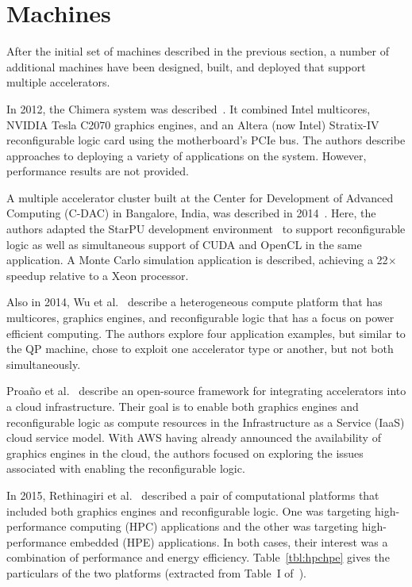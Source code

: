 \section{Machines}
\label{sec:machines}

After the initial set of machines described in the previous section,
a number of additional machines have been designed, built, and deployed
that support multiple accelerators.

In 2012, the Chimera system was described~\cite{ibs12}.
It combined Intel multicores, NVIDIA Tesla C2070 graphics engines,
and an Altera (now Intel) Stratix-IV reconfigurable logic card using
the motherboard's PCIe bus. The authors describe approaches to deploying
a variety of applications on the system. However, performance results
are not provided.

A multiple accelerator cluster built at the Center for Development of
Advanced Computing (C-DAC) in Bangalore, India, was described in
2014~\cite{admb14}. Here, the authors adapted the StarPU development
environment~\cite{starpu} to support reconfigurable logic as well as
simultaneous support of CUDA and OpenCL in the same application.
A Monte Carlo simulation application is described, achieving a 22$\times$
speedup relative to a Xeon processor.

Also in 2014, Wu et al.~\cite{whk+14} describe a heterogeneous compute
platform that has multicores, graphics engines, and reconfigurable logic
that has a focus on power efficient computing.
The authors explore four application examples, but similar to the QP
machine, chose to exploit one accelerator type or another, but not both
simultaneously.

Proa\~no et al.~\cite{pcc14} describe an open-source framework for
integrating accelerators into a cloud infrastructure.  Their goal is
to enable both graphics engines and reconfigurable logic as compute resources
in the Infrastructure as a Service (IaaS) cloud service model.
With AWS having already announced the availability of graphics engines
in the cloud, the authors focused on exploring the issues associated
with enabling the reconfigurable logic.

In 2015, Rethinagiri et al.~\cite{rpm+15} described a pair of computational
platforms that included both graphics engines and reconfigurable logic.  One
was targeting high-performance computing (HPC) applications and the other
was targeting high-performance embedded (HPE) applications.
In both cases, their interest was a combination of performance and
energy efficiency. Table~\ref{tbl:hpchpe} gives the particulars of
the two platforms (extracted from Table~I of~\cite{rpm+15}).

